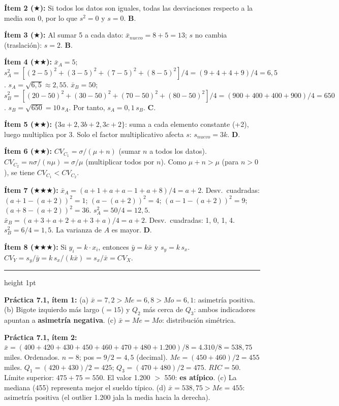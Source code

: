\documentclass[11pt, letterpaper]{article}
\newcommand{\subbloque}[1]{%
  \vspace{14pt}
  \noindent{\large\bfseries\color{zenitnavy} #1}\par
  \vspace{4pt}\hrule height 1pt\vspace{8pt}}
\begin{document}
\textbf{Ítem 2 ($\bigstar$):}
Si todos los datos son iguales, todas las desviaciones respecto a la media son 0, por lo que $s^2=0$ y $s=0$. \textbf{B}.

\textbf{Ítem 3 ($\bigstar$):}
Al sumar 5 a cada dato: $\bar{x}_{nuevo}=8+5=13$; $s$ no cambia (traslación): $s=2$. \textbf{B}.

\textbf{Ítem 4 ($\bigstar\bigstar$):}
$\bar{x}_A=5$; $s_A^2=[(2{-}5)^2+(3{-}5)^2+(7{-}5)^2+(8{-}5)^2]/4=(9+4+4+9)/4=6{,}5$. $s_A=\sqrt{6{,}5}\approx2{,}55$.
$\bar{x}_B=50$; $s_B^2=[(20{-}50)^2+(30{-}50)^2+(70{-}50)^2+(80{-}50)^2]/4=(900+400+400+900)/4=650$. $s_B=\sqrt{650}=10\,s_A$.
Por tanto, $s_A=0{,}1\,s_B$. \textbf{C}.

\textbf{Ítem 5 ($\bigstar\bigstar$):}
$\{3a+2, 3b+2, 3c+2\}$: suma a cada elemento constante (+2), luego multiplica por 3. Solo el factor multiplicativo afecta $s$: $s_{nuevo}=3k$. \textbf{D}.

\textbf{Ítem 6 ($\bigstar\bigstar$):}
$CV_{C_1}=\sigma/(\mu+n)$ (sumar $n$ a todos los datos).
$CV_{C_2}=n\sigma/(n\mu)=\sigma/\mu$ (multiplicar todos por $n$).
Como $\mu+n>\mu$ (para $n>0$), se tiene $CV_{C_1}<CV_{C_2}$.

\textbf{Ítem 7 ($\bigstar\bigstar\bigstar$):}
$\bar{x}_A=(a+1+a+a-1+a+8)/4=a+2$. Desv.\ cuadradas: $(a+1-(a+2))^2=1$; $(a-(a+2))^2=4$; $(a-1-(a+2))^2=9$; $(a+8-(a+2))^2=36$.
$s_A^2=50/4=12{,}5$.
$\bar{x}_B=(a+3+a+2+a+3+a)/4=a+2$. Desv.\ cuadradas: 1, 0, 1, 4. $s_B^2=6/4=1{,}5$.
La varianza de $A$ es mayor. \textbf{D}.

\textbf{Ítem 8 ($\bigstar\bigstar\bigstar$):}
Si $y_i=k\cdot x_i$, entonces $\bar{y}=k\bar{x}$ y $s_y=k\,s_x$.
$CV_Y=s_y/\bar{y}=k\,s_x/(k\bar{x})=s_x/\bar{x}=CV_X$. \checkmark

\subbloque{Sección 7 --- Análisis e interpretación}

\textbf{Práctica 7.1, ítem 1:}
(a) $\bar{x}=7{,}2>Me=6{,}8>Mo=6{,}1$: asimetría positiva.
(b) Bigote izquierdo más largo ($= 15$) y $Q_2$ más cerca de $Q_3$: ambos indicadores apuntan a \textbf{asimetría negativa}.
(c) $\bar{x}=Me=Mo$: distribución simétrica.

\textbf{Práctica 7.1, ítem 2:}
$\bar{x}=(400+420+430+450+460+470+480+1.200)/8=4.310/8=538{,}75$ miles.
Ordenados. $n=8$; pos$=9/2=4{,}5$ (decimal). $Me=(450+460)/2=455$ miles.
$Q_1=(420+430)/2=425$; $Q_3=(470+480)/2=475$. $RIC=50$.
Límite superior: $475+75=550$. El valor 1.200 $>$ 550: \textbf{es atípico}.
(c) La mediana (455) representa mejor el sueldo típico.
(d) $\bar{x}=538{,}75>Me=455$: asimetría positiva (el outlier 1.200 jala la media hacia la derecha).
\end{document}
